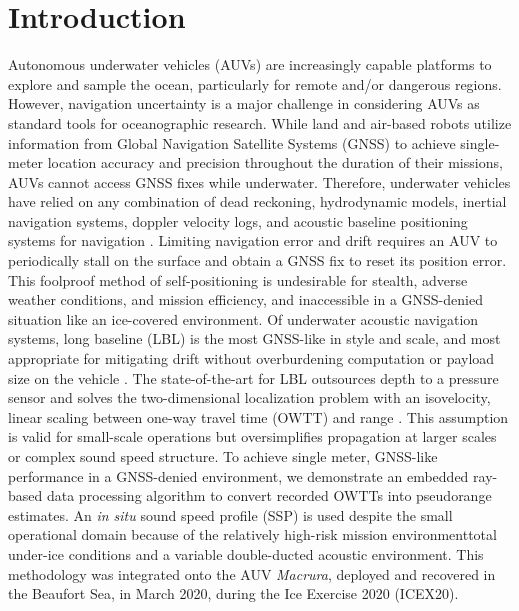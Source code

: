\documentclass[preprint,TurnOnLineNumbers]{JASA}
\begin{document}

\section{Introduction}
\label{sec:1}  
Autonomous underwater vehicles (AUVs) are increasingly capable platforms to explore and sample the ocean, particularly for remote and/or dangerous regions.
However, navigation uncertainty is a major challenge in considering AUVs as standard tools for oceanographic research.
While land and air-based robots utilize information from Global Navigation Satellite Systems (GNSS) to achieve single-meter location accuracy and precision throughout the duration of their missions, AUVs cannot access GNSS fixes while underwater.
Therefore, underwater vehicles have relied on any combination of dead reckoning, hydrodynamic models, inertial navigation systems, doppler velocity logs, and acoustic baseline positioning systems for navigation \citep{paull_auv_2014}.
Limiting navigation error and drift requires an AUV to periodically stall on the surface and obtain a GNSS fix to reset its position error.
This foolproof method of self-positioning is undesirable for stealth, adverse weather conditions, and mission efficiency, and inaccessible in a GNSS-denied situation like an ice-covered environment.
Of underwater acoustic navigation systems, long baseline (LBL) is the most GNSS-like in style and scale, and most appropriate for mitigating drift without overburdening computation or payload size on the vehicle \citep{van_uffelen_global_2021}.
The state-of-the-art for LBL outsources depth to a pressure sensor and solves the two-dimensional localization problem with an isovelocity, linear scaling between one-way travel time (OWTT) and range \citep{Eustice2006,Eustice2007,webster_advances_2012,Webster2009}.
This assumption is valid for small-scale operations but oversimplifies propagation at larger scales or complex sound speed structure.
To achieve single meter, GNSS-like performance in a GNSS-denied environment, we demonstrate an embedded ray-based data processing algorithm to convert recorded OWTTs into pseudorange estimates.
An \textit{in situ} sound speed profile (SSP) is used despite the small operational domain because of the relatively high-risk mission environment\textemdash total under-ice conditions and a variable double-ducted acoustic environment.
This methodology was integrated onto the AUV \emph{Macrura}, deployed and recovered in the Beaufort Sea, in March 2020, during the Ice Exercise 2020 (ICEX20).
\end{document}
